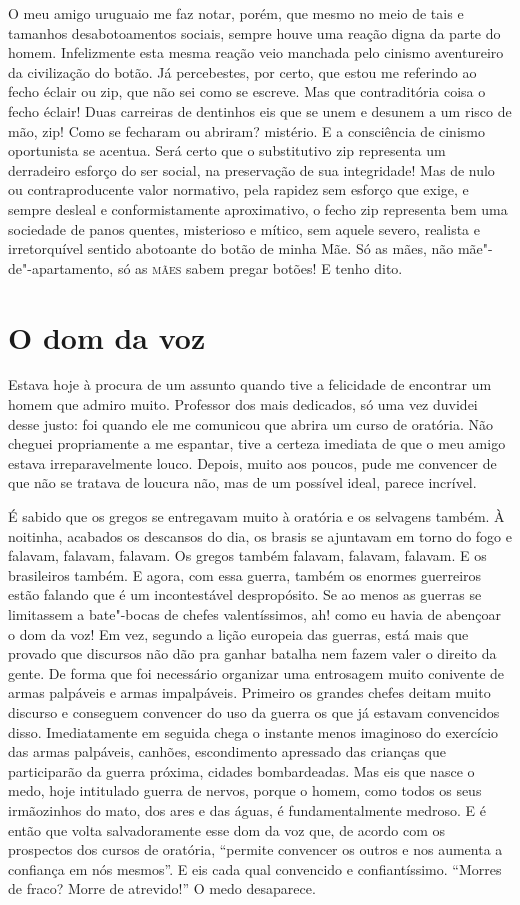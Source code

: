 O meu amigo uruguaio me faz notar, porém, que mesmo no meio de tais e
tamanhos desabotoamentos sociais, sempre houve uma reação digna da parte
do homem. Infelizmente esta mesma reação veio manchada pelo cinismo
aventureiro da civilização do botão. Já percebestes, por certo, que
estou me referindo ao fecho éclair ou zip, que não sei como se escreve.
Mas que contraditória coisa o fecho éclair! Duas carreiras de dentinhos
eis que se unem e desunem a um risco de mão, zip! Como se fecharam ou
abriram? mistério. E a consciência de cinismo oportunista se acentua.
Será certo que o substitutivo zip representa um derradeiro esforço do
ser social, na preservação de sua integridade! Mas de nulo ou
contraproducente valor normativo, pela rapidez sem esforço que exige, e
sempre desleal e conformistamente aproximativo, o fecho zip representa
bem uma sociedade de panos quentes, misterioso e mítico, sem aquele
severo, realista e irretorquível sentido abotoante do botão de minha
Mãe. Só as mães, não mãe"-de"-apartamento, só as \textsc{mães} sabem pregar botões!
E tenho dito.

\chapter{O dom da voz}

Estava hoje à procura de um assunto quando tive a felicidade de
encontrar um homem que admiro muito. Professor dos mais dedicados, só
uma vez duvidei desse justo: foi quando ele me comunicou que abrira um
curso de oratória. Não cheguei propriamente a me espantar, tive a
certeza imediata de que o meu amigo estava irreparavelmente louco.
Depois, muito aos poucos, pude me convencer de que não se tratava de
loucura não, mas de um possível ideal, parece incrível.

É sabido que os gregos se entregavam muito à oratória e os selvagens
também. À noitinha, acabados os descansos do dia, os brasis se ajuntavam
em torno do fogo e falavam, falavam, falavam. Os gregos também falavam,
falavam, falavam. E os brasileiros também. E agora, com essa guerra,
também os enormes guerreiros estão falando que é um incontestável
despropósito. Se ao menos as guerras se limitassem a bate"-bocas de
chefes valentíssimos, ah! como eu havia de abençoar o dom da voz! Em
vez, segundo a lição europeia das guerras, está mais que provado que
discursos não dão pra ganhar batalha nem fazem valer o direito da gente.
De forma que foi necessário organizar uma entrosagem muito conivente de
armas palpáveis e armas impalpáveis. Primeiro os grandes chefes deitam
muito discurso e conseguem convencer do uso da guerra os que já estavam
convencidos disso. Imediatamente em seguida chega o instante menos
imaginoso do exercício das armas palpáveis, canhões, escondimento
apressado das crianças que participarão da guerra próxima, cidades
bombardeadas. Mas eis que nasce o medo, hoje intitulado guerra de
nervos, porque o homem, como todos os seus irmãozinhos do mato, dos ares
e das águas, é fundamentalmente medroso. E é então que volta
salvadoramente esse dom da voz que, de acordo com os prospectos dos
cursos de oratória, ``permite convencer os outros e nos aumenta a
confiança em nós mesmos''. E eis cada qual convencido e confiantíssimo.
``Morres de fraco? Morre de atrevido!'' O medo desaparece.

